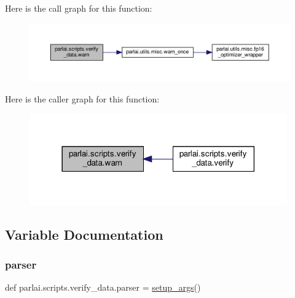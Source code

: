 Here is the call graph for this function\+:
\nopagebreak
\begin{figure}[H]
\begin{center}
\leavevmode
\includegraphics[width=350pt]{namespaceparlai_1_1scripts_1_1verify__data_ab1f264e6d69b1abe3399ba05512f8c66_cgraph}
\end{center}
\end{figure}
Here is the caller graph for this function\+:
\nopagebreak
\begin{figure}[H]
\begin{center}
\leavevmode
\includegraphics[width=314pt]{namespaceparlai_1_1scripts_1_1verify__data_ab1f264e6d69b1abe3399ba05512f8c66_icgraph}
\end{center}
\end{figure}


\subsection{Variable Documentation}
\mbox{\label{namespaceparlai_1_1scripts_1_1verify__data_a77500ea3bf26e7b433f37d4fd3c831d3}} 
\subsubsection{\texorpdfstring{parser}{parser}}
{\footnotesize\ttfamily def parlai.\+scripts.\+verify\+\_\+data.\+parser = \hyperlink{namespaceparlai_1_1scripts_1_1verify__data_aecfb15331606adc88ee4221c2945a17d}{setup\+\_\+args}()}



